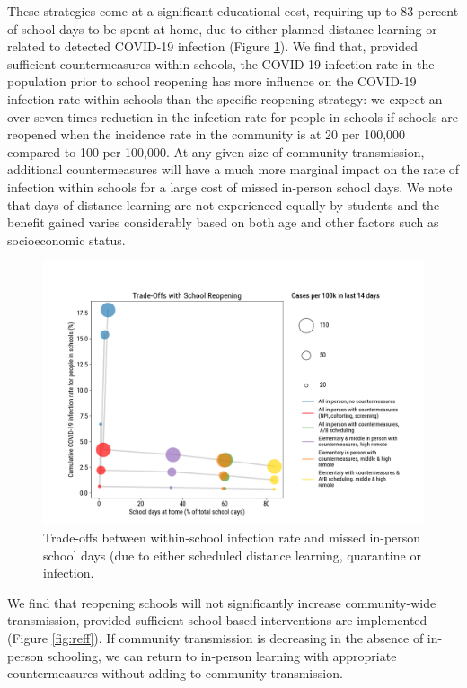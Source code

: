 \documentclass[preprint,12pt]{elsarticle}
\begin{document}
These strategies come at a significant educational cost, requiring up to 83 percent of school days to be spent at home, due to either planned distance learning or related to detected COVID-19 infection (Figure \ref{fig:tradeoffs}). We find that, provided sufficient countermeasures within schools, the COVID-19 infection rate in the population prior to school reopening has more influence on the COVID-19 infection rate within schools than the specific reopening strategy: we expect an over seven times reduction in the infection rate for people in schools if schools are reopened when the incidence rate in the community is at 20 per 100,000 compared to 100 per 100,000. At any given size of community transmission, additional countermeasures will have a much more marginal impact on the rate of infection within schools for a large cost of missed in-person school days. We note that days of distance learning are not experienced equally by students and the benefit gained varies considerably based on both age and other factors such as socioeconomic status.

\begin{figure}
    \centering
    \includegraphics[scale=0.48]{tradeoffs_2020-08-06.png}
    \caption{Trade-offs between within-school infection rate and missed in-person school days (due to either scheduled distance learning, quarantine or infection.}
    \label{fig:tradeoffs}
\end{figure}

We find that reopening schools will not significantly increase community-wide transmission, provided sufficient school-based interventions are implemented (Figure \ref{fig:reff}). If community transmission is decreasing in the absence of in-person schooling, we can return to in-person learning with appropriate countermeasures without adding to community transmission. 
\end{document}
